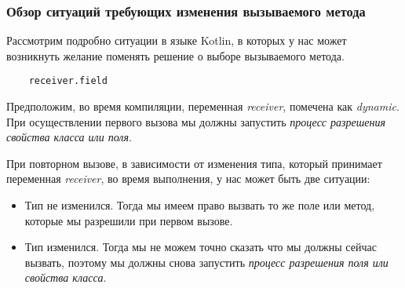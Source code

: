 \subsubsection{Обзор ситуаций требующих изменения вызываемого метода}
\label{sec:methodChangeOverview}

Рассмотрим подробно ситуации в языке Kotlin, в которых у нас может возникнуть желание поменять решение о выборе вызываемого метода.

\begin{verbatim}
    receiver.field
\end{verbatim}

Предположим, во время компиляции, переменная \textit{receiver}, помечена как \textit{dynamic}. При осуществлении первого
вызова мы должны запустить \textit{процесс разрешения свойства класса или поля}.


При повторном вызове, в зависимости от изменения типа, который принимает переменная \textit{receiver}, во время выполнения, у нас может быть две ситуации:

\begin{itemize}
    \item Тип не изменился. Тогда мы имеем право вызвать то же поле или метод, которые мы разрешили при первом вызове.
    \item Тип изменился. Тогда мы не можем точно сказать что мы должны сейчас вызвать, поэтому мы должны снова запустить \textit{процесс разрешения поля или свойства класса}.
\end{itemize}

